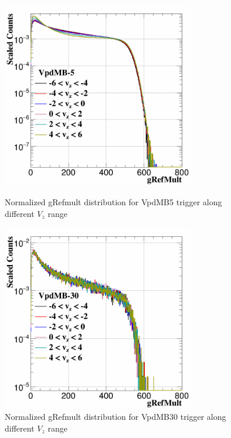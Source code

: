\documentclass[a4paper]{article}
\begin{document}
\begin{figure}[htbp]
\begin{minipage}[htbp]{0.52\linewidth}
\centering
\includegraphics[width=0.75\textwidth]{fig/MB5_gref.png}
\caption{Normalized gRefmult distribution for VpdMB5 trigger along different $V_{z}$ range\label{fig:MB5_vz}}
\end{minipage}
\hfill
\begin{minipage}[htbp]{0.52\linewidth}
\centering
\includegraphics[width=0.75\textwidth]{fig/MB30_gref.png} 
\caption{Normalized gRefmult distribution for VpdMB30 trigger along different $V_{z}$ range\label{fig:MB30_vz}}
\end{minipage}
\end{figure}
\end{document}
